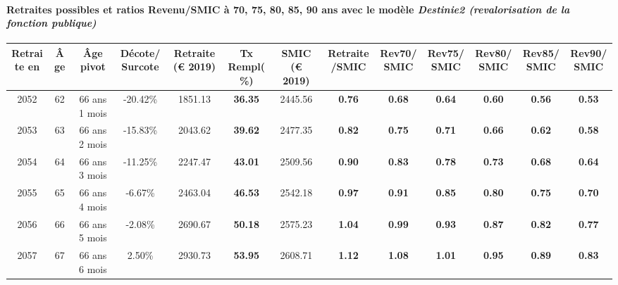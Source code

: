 \paragraph{Retraites possibles et ratios Revenu/SMIC à 70, 75, 80, 85, 90 ans avec le modèle \emph{Destinie2 (revalorisation de la fonction publique)}}  
 
{ \scriptsize \begin{center} 
\begin{tabular}[htb]{|c|c||c|c||c|c||c||c|c|c|c|c|c|} 
\hline 
 Retraite en &  Âge &  Âge pivot &  Décote/Surcote &  Retraite (\euro{} 2019) &  Tx Rempl(\%) &  SMIC (\euro{} 2019) &  Retraite/SMIC &  Rev70/SMIC &  Rev75/SMIC &  Rev80/SMIC &  Rev85/SMIC &  Rev90/SMIC \\ 
\hline \hline 
 2052 &  62 &  66 ans 1 mois &  -20.42\% &  1851.13 &  {\bf 36.35} &  2445.56 &  {\bf {\color{red} 0.76}} &  {\bf {\color{red} 0.68}} &  {\bf {\color{red} 0.64}} &  {\bf {\color{red} 0.60}} &  {\bf {\color{red} 0.56}} &  {\bf {\color{red} 0.53}} \\ 
\hline 
 2053 &  63 &  66 ans 2 mois &  -15.83\% &  2043.62 &  {\bf 39.62} &  2477.35 &  {\bf {\color{red} 0.82}} &  {\bf {\color{red} 0.75}} &  {\bf {\color{red} 0.71}} &  {\bf {\color{red} 0.66}} &  {\bf {\color{red} 0.62}} &  {\bf {\color{red} 0.58}} \\ 
\hline 
 2054 &  64 &  66 ans 3 mois &  -11.25\% &  2247.47 &  {\bf 43.01} &  2509.56 &  {\bf {\color{red} 0.90}} &  {\bf {\color{red} 0.83}} &  {\bf {\color{red} 0.78}} &  {\bf {\color{red} 0.73}} &  {\bf {\color{red} 0.68}} &  {\bf {\color{red} 0.64}} \\ 
\hline 
 2055 &  65 &  66 ans 4 mois &  -6.67\% &  2463.04 &  {\bf 46.53} &  2542.18 &  {\bf {\color{red} 0.97}} &  {\bf {\color{red} 0.91}} &  {\bf {\color{red} 0.85}} &  {\bf {\color{red} 0.80}} &  {\bf {\color{red} 0.75}} &  {\bf {\color{red} 0.70}} \\ 
\hline 
 2056 &  66 &  66 ans 5 mois &  -2.08\% &  2690.67 &  {\bf 50.18} &  2575.23 &  {\bf 1.04} &  {\bf {\color{red} 0.99}} &  {\bf {\color{red} 0.93}} &  {\bf {\color{red} 0.87}} &  {\bf {\color{red} 0.82}} &  {\bf {\color{red} 0.77}} \\ 
\hline 
 2057 &  67 &  66 ans 6 mois &  2.50\% &  2930.73 &  {\bf 53.95} &  2608.71 &  {\bf 1.12} &  {\bf 1.08} &  {\bf 1.01} &  {\bf {\color{red} 0.95}} &  {\bf {\color{red} 0.89}} &  {\bf {\color{red} 0.83}} \\ 
\hline 
\hline 
\end{tabular} 
\end{center} } 

